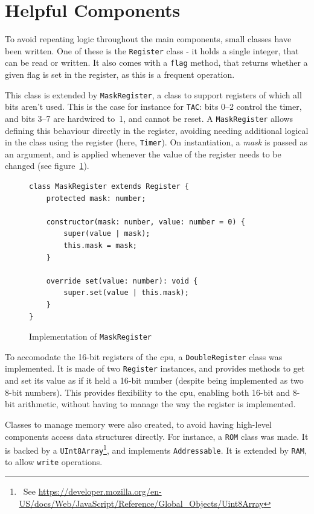\documentclass[11pt]{informatics-report}
\newcommand{\ftnt}[1]{\footnote{~See \url{#1}}}
\begin{document}
\section{Helpful Components}

To avoid repeating logic throughout the main components, small classes have been written. One of these is the \texttt{Register} class - it holds a single integer, that can be read or written. It also comes with a \texttt{flag} method, that returns whether a given flag is set in the register, as this is a frequent operation.

This class is extended by \texttt{MaskRegister}, a class to support registers of which all bits aren't used. This is the case for instance for \texttt{TAC}: bits 0--2 control the timer, and bits 3--7 are hardwired to~1, and cannot be reset. A \texttt{MaskRegister} allows defining this behaviour directly in the register, avoiding needing additional logical in the class using the register (here, \texttt{Timer}). On instantiation, a \textit{mask} is passed as an argument, and is applied whenever the value of the register needs to be changed (see figure~\ref{fig:mask-register}).

\begin{figure}[h]
    \begin{verbatim}
class MaskRegister extends Register {
    protected mask: number;

    constructor(mask: number, value: number = 0) {
        super(value | mask);
        this.mask = mask;
    }

    override set(value: number): void {
        super.set(value | this.mask);
    }
}
    \end{verbatim}
    \caption{Implementation of \texttt{MaskRegister}}
    \label{fig:mask-register}
\end{figure}

To accomodate the 16-bit registers of the \gls{cpu}, a \texttt{DoubleRegister} class was implemented. It is made of two \texttt{Register} instances, and provides methods to get and set its value as if it held a 16-bit number (despite being implemented as two 8-bit numbers). This provides flexibility to the \gls{cpu}, enabling both 16-bit and 8-bit arithmetic, without having to manage the way the register is implemented.

Classes to manage memory were also created, to avoid having high-level components access data structures directly. For instance, a \texttt{ROM} class was made. It is backed by a \texttt{UInt8Array}\ftnt{https://developer.mozilla.org/en-US/docs/Web/JavaScript/Reference/Global_Objects/Uint8Array}, and implements \texttt{Addressable}. It is extended by \texttt{RAM}, to allow \texttt{write} operations. 
\end{document}
